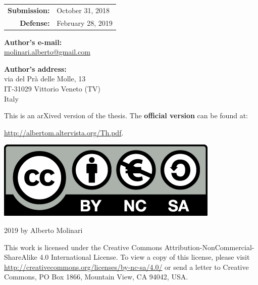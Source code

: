 \thispagestyle{empty}

\begin{center}
	\begin{tabular}{rl}
	\textbf{Submission:}& October 31, 2018 \\ 
	\textbf{Defense:}& February 28, 2019\\ 
	\end{tabular} 
\end{center}

\vfill

\hrulefill

\vfill

\noindent
\textbf{Author’s e-mail:} \\\href{mailto:molinari.alberto@gmail.com}{molinari.alberto@gmail.com}

\bigskip

\noindent
\textbf{Author’s address:} \\
via del Prà delle Molle, 13 \\
IT-31029 Vittorio Veneto (TV) \\
Italy

\vfill

\begin{center}
This is an arXived version of the thesis. The \textbf{official version} can be 
found at:
\medskip

\url{http://albertom.altervista.org/Th.pdf}.
\end{center}


\vfill

\begin{center}
\includegraphics[scale=0.25]{FrontBackMatter/by-nc-sa.png} 
\medskip

\textcopyright{} 2019 by Alberto Molinari
\end{center}

\noindent
This work is licensed under the Creative Commons Attribution-NonCommercial-ShareAlike 4.0 International License.
To view a copy of this license, please visit
\url{http://creativecommons.org/licenses/by-nc-sa/4.0/}
or send a letter to Creative Commons, PO Box 1866, Mountain View, CA 94042, USA.